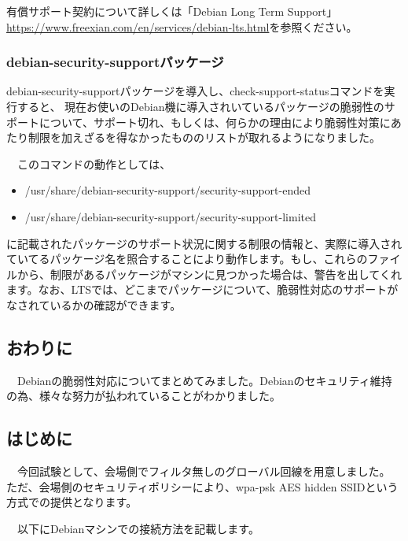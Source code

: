 \documentclass[mingoth,a4paper]{jsarticle}
\begin{document}
 有償サポート契約について詳しくは「Debian Long Term Support」\url{https://www.freexian.com/en/services/debian-lts.html}を参照ください。

\subsubsection{debian-security-supportパッケージ}

 debian-security-supportパッケージを導入し、check-support-statusコマンドを実行すると、
現在お使いのDebian機に導入されいているパッケージの脆弱性のサポートについて、サポート切れ、もしくは、何らかの理由により脆弱性対策にあたり制限を加えざるを得なかったもののリストが取れるようになりました。

　このコマンドの動作としては、
\begin{itemize}
\item  /usr/share/debian-security-support/security-support-ended
\item /usr/share/debian-security-support/security-support-limited
\end{itemize}
に記載されたパッケージのサポート状況に関する制限の情報と、実際に導入されていてるパッケージ名を照合することにより動作します。もし、これらのファイルから、制限があるパッケージがマシンに見つかった場合は、警告を出してくれます。なお、LTSでは、どこまでパッケージについて、脆弱性対応のサポートがなされているかの確認ができます。

\subsection{おわりに}

　Debianの脆弱性対応についてまとめてみました。Debianのセキュリティ維持の為、様々な努力が払われていることがわかりました。
   
 \subsection{はじめに}

　今回試験として、会場側でフィルタ無しのグローバル回線を用意しました。
ただ、会場側のセキュリティポリシーにより、wpa-psk AES hidden SSIDという
方式での提供となります。

　以下にDebianマシンでの接続方法を記載します。
\end{document}
